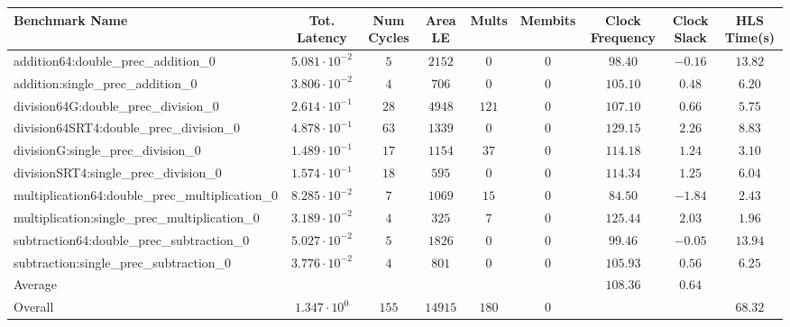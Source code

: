 \begin{tabular}{|l|c|c|c|c|c|c|c|c|}
\hline
Benchmark Name                                   & Tot. Latency            & Num Cycles & Area LE   & Mults   & Membits & Clock Frequency & Clock Slack & HLS Time(s) \\
\hline
addition64:double\_prec\_addition\_0             & $ 5.081 \cdot 10^{-2} $ & $ 5      $ & $ 2152  $ & $ 0   $ & $ 0   $ & $ 98.40       $ & $ -0.16   $ & $ 13.82   $ \\
addition:single\_prec\_addition\_0               & $ 3.806 \cdot 10^{-2} $ & $ 4      $ & $ 706   $ & $ 0   $ & $ 0   $ & $ 105.10      $ & $ 0.48    $ & $ 6.20    $ \\
division64G:double\_prec\_division\_0            & $ 2.614 \cdot 10^{-1} $ & $ 28     $ & $ 4948  $ & $ 121 $ & $ 0   $ & $ 107.10      $ & $ 0.66    $ & $ 5.75    $ \\
division64SRT4:double\_prec\_division\_0         & $ 4.878 \cdot 10^{-1} $ & $ 63     $ & $ 1339  $ & $ 0   $ & $ 0   $ & $ 129.15      $ & $ 2.26    $ & $ 8.83    $ \\
divisionG:single\_prec\_division\_0              & $ 1.489 \cdot 10^{-1} $ & $ 17     $ & $ 1154  $ & $ 37  $ & $ 0   $ & $ 114.18      $ & $ 1.24    $ & $ 3.10    $ \\
divisionSRT4:single\_prec\_division\_0           & $ 1.574 \cdot 10^{-1} $ & $ 18     $ & $ 595   $ & $ 0   $ & $ 0   $ & $ 114.34      $ & $ 1.25    $ & $ 6.04    $ \\
multiplication64:double\_prec\_multiplication\_0 & $ 8.285 \cdot 10^{-2} $ & $ 7      $ & $ 1069  $ & $ 15  $ & $ 0   $ & $ 84.50       $ & $ -1.84   $ & $ 2.43    $ \\
multiplication:single\_prec\_multiplication\_0   & $ 3.189 \cdot 10^{-2} $ & $ 4      $ & $ 325   $ & $ 7   $ & $ 0   $ & $ 125.44      $ & $ 2.03    $ & $ 1.96    $ \\
subtraction64:double\_prec\_subtraction\_0       & $ 5.027 \cdot 10^{-2} $ & $ 5      $ & $ 1826  $ & $ 0   $ & $ 0   $ & $ 99.46       $ & $ -0.05   $ & $ 13.94   $ \\
subtraction:single\_prec\_subtraction\_0         & $ 3.776 \cdot 10^{-2} $ & $ 4      $ & $ 801   $ & $ 0   $ & $ 0   $ & $ 105.93      $ & $ 0.56    $ & $ 6.25    $ \\
\hline
Average                                          & $                     $ & $        $ & $       $ & $     $ & $     $ & $ 108.36      $ & $ 0.64    $ & $         $ \\
\hline
Overall                                          & $ 1.347 \cdot 10^{0}  $ & $ 155    $ & $ 14915 $ & $ 180 $ & $ 0   $ & $             $ & $         $ & $ 68.32   $ \\
\hline
\end{tabular}
